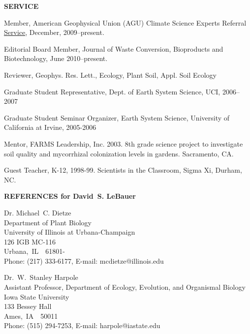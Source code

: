 \documentclass[12pt,twoside]{article}
\begin{document}
{\textbf{SERVICE}
\begin{itemize*}
\item Member, American Geophysical Union (AGU) Climate Science Experts Referral \href{http://www.agu.org/news/press/pr_archives/2010/2010-14.shtml}{Service}, December, 2009--present.
\item Editorial Board Member, Journal of Waste Conversion, Bioproducts and Biotechnology,  June 2010--present.
\item Reviewer, Geophys. Res. Lett., Ecology, Plant Soil, Appl. Soil Ecology %
\item Graduate Student Representative, Dept. of Earth System Science, UCI, 2006--2007
\item Graduate Student Seminar Organizer, Earth System Science, University of California at Irvine, 2005-2006
\item Mentor, FARMS Leadership, Inc. 2003. 8th grade science project to investigate soil quality and mycorrhizal colonization levels in gardens. Sacramento, CA.
\item Guest Teacher, K-12, 1998-99. Scientists in the Classroom, Sigma Xi, Durham, NC.
\end{itemize*}


\pagebreak
{} %
\textbf{REFERENCES for David~S. LeBauer}
\begin{enumerate*}
\item Dr. Michael~C. Dietze\\
Department of Plant Biology\\
University of Illinois at Urbana-Champaign\\
126 IGB MC-116\\
Urbana,~IL~~61801-\\
Phone: (217) 333-6177, E-mail: mcdietze@illinois.edu

\item Dr.~W.~Stanley Harpole\\
Assistant Professor, Department of Ecology, Evolution, and Organismal Biology\\
Iowa State University\\
133 Bessey Hall\\
Ames,~IA~~50011 \\
Phone: (515) 294-7253, E-mail: harpole@iastate.edu


\end{enumerate*}}
\end{document}
